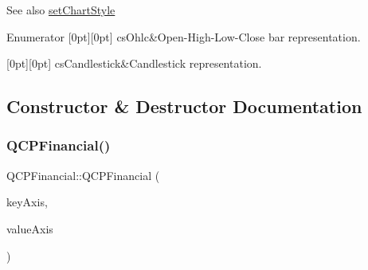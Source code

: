 \begin{DoxySeeAlso}{See also}
\hyperlink{class_q_c_p_financial_a5a59175d36279d71596e64d7bb65596f}{set\+Chart\+Style} 
\end{DoxySeeAlso}
\begin{DoxyEnumFields}{Enumerator}
[0pt][0pt]{}\hypertarget{class_q_c_p_financial_a0f800e21ee98d646dfc6f8f89d10ebfba3a516016c9298d3e95dd82aa203c4390}{}\label{class_q_c_p_financial_a0f800e21ee98d646dfc6f8f89d10ebfba3a516016c9298d3e95dd82aa203c4390} 
cs\+Ohlc&Open-\/\+High-\/\+Low-\/\+Close bar representation. \\
\hline

[0pt][0pt]{}\hypertarget{class_q_c_p_financial_a0f800e21ee98d646dfc6f8f89d10ebfbac803cbd39f26e3f206bcc7028679e62f}{}\label{class_q_c_p_financial_a0f800e21ee98d646dfc6f8f89d10ebfbac803cbd39f26e3f206bcc7028679e62f} 
cs\+Candlestick&Candlestick representation. \\
\hline

\end{DoxyEnumFields}


\subsection{Constructor \& Destructor Documentation}
\hypertarget{class_q_c_p_financial_a4702d5248feeb9d1ec6e3ce725b10b32}{}\label{class_q_c_p_financial_a4702d5248feeb9d1ec6e3ce725b10b32} 
\subsubsection{\texorpdfstring{Q\+C\+P\+Financial()}{QCPFinancial()}}
{\footnotesize\ttfamily Q\+C\+P\+Financial\+::\+Q\+C\+P\+Financial (\begin{DoxyParamCaption}\item[{\hyperlink{class_q_c_p_axis}{Q\+C\+P\+Axis} $\ast$}]{key\+Axis,  }\item[{\hyperlink{class_q_c_p_axis}{Q\+C\+P\+Axis} $\ast$}]{value\+Axis }\end{DoxyParamCaption})\hspace{0.3cm}{\ttfamily [explicit]}}

